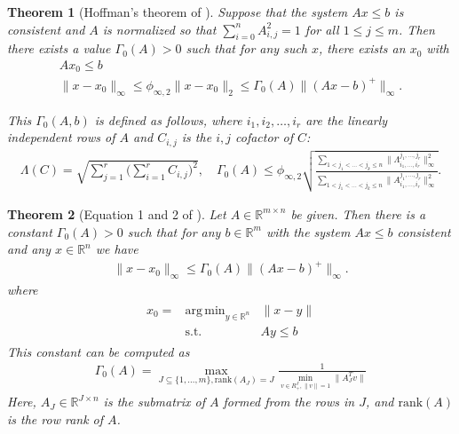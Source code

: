 \documentclass{article}
\newtheorem{theorem}{Theorem}[section]
\theoremstyle{case}
\numberwithin{theorem}{subsection}
\DeclareMathOperator*{\argmin}{arg\,min}
\newcommand{\huff}{{\Gamma_0}}
\newcommand{\Rm}{\mathbb R^m}
\newcommand{\Rn}{\mathbb R^n}
\begin{document}
\color{red}
\begin{theorem}[Hoffman's theorem of \cite{hoffman_theorem}]
\label{hoffman_old}
Suppose that the system $Ax \le b$ is consistent and $A$ is normalized so that $\sum_{i = 0}^n{A}_{i,j}^2 = 1$ for all $1 \le j \le m$.
Then there exists a value $\huff(A) > 0$ such that for any such $x$, there exists an $x_0$ with
\begin{align*}
Ax_0 \le b \\
\|x - x_0\|_{\infty} \le \phi_{\infty, 2}\|x - x_0\|_2 \le {\huff(A)} \|(Ax - b)^+\|_\infty.
\end{align*}

This $\huff(A,b)$ is defined as follows, where $i_1, i_2, \ldots, i_r$ are the linearly independent rows of $A$ and $C_{i,j}$ is the $i,j$ cofactor of $C$:
\begin{align*}
\Lambda(C) = \sqrt{\sum_{j=1}^r\bigg(\sum_{i=1}^r C_{i,j}\bigg)^2}, \quad
{\huff(A)} \le \phi_{\infty, 2}\sqrt{\frac{\sum_{1 < j_1 < \ldots < j_k \le n} \|\Lambda^{j_1,\ldots,j_r}_{i_1,\ldots, i_r}\|_{\infty}^2}{\sum_{1 < j_1 < \ldots < j_k \le n} \|A^{j_1,\ldots,j_r}_{i_1,\ldots, i_r}\|_{\infty}^2}}.
\end{align*}
\end{theorem}



\begin{theorem}[Equation 1 and 2 of \cite{pena2018algorithm}]
\label{hoffman}
Let $A \in \mathbb R^{m \times n}$ be given.
Then there is a constant $\huff(A) > 0$ such that for any $b \in \Rm$ with the system $Ax \le b$ consistent and any $x \in \Rn$ we have
\begin{align*}
\|x - x_0\|_{\infty} \le \huff(A) \|(Ax - b)^+\|_\infty.
\end{align*}
where
\begin{align*}
\begin{array}{ccc}
x_0 = & \argmin_{y \in \Rn} & \|x - y\| \\
      & \textrm{s.t.}    & Ay \le b
\end{array}
\end{align*}
This constant can be computed as
\begin{align*}
\huff(A) = \max_{J \subseteq \{1,\ldots,m\}, \textrm{rank}(A_J) = J} \frac 1 {\min_{v \in R^J_{+}, \|v\| = 1} \|A_J^Tv\|}
\end{align*}
Here, $A_J \in \mathbb R^{J \times n}$ is the submatrix of $A$ formed from the rows in $J$, and $\textrm{rank}(A)$ is the row rank of $A$.
\end{theorem}
\end{document}

